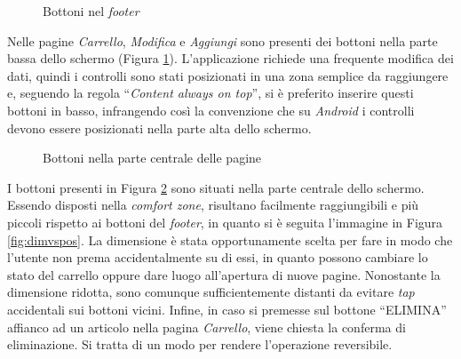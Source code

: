 \documentclass[12pt, a4paper, titlepage]{report}
\begin{document}
	\begin{figure}[H] 
		\centering
		\hspace*{2cm}
		\caption{Bottoni nel \textit{footer}}
		\label{fig:buttons}
	\end{figure}
	Nelle pagine \textit{Carrello}, \textit{Modifica} e \textit{Aggiungi} sono presenti dei bottoni nella parte bassa dello schermo (Figura \ref{fig:buttons}). L'applicazione richiede una frequente modifica dei dati, quindi i controlli sono stati posizionati in una zona semplice da raggiungere e, seguendo la regola ``\textit{Content always on top}'', si è preferito inserire questi bottoni in basso, infrangendo così la convenzione che su \textit{Android} i controlli devono essere posizionati nella parte alta dello schermo. 
	\begin{figure}[H] 
		\centering
		\hspace*{1cm}
		\hspace*{1cm}
		\caption{Bottoni nella parte centrale delle pagine}
		\label{fig:item-buttons}
	\end{figure}
	\noindent I bottoni presenti in Figura \ref{fig:item-buttons} sono situati nella parte centrale dello schermo. Essendo disposti nella \textit{comfort zone}, risultano facilmente raggiungibili e più piccoli rispetto ai bottoni del \textit{footer}, in quanto si è seguita l'immagine in Figura \ref{fig:dimvspos}. La dimensione è stata opportunamente scelta per fare in modo che l'utente non prema accidentalmente su di essi, in quanto possono cambiare lo stato del carrello oppure dare luogo all'apertura di nuove pagine. Nonostante la dimensione ridotta, sono comunque sufficientemente distanti da evitare \textit{tap} accidentali sui bottoni vicini. Infine, in caso si premesse sul bottone ``ELIMINA'' affianco ad un articolo nella pagina \textit{Carrello}, viene chiesta la conferma di eliminazione. Si tratta di un modo per rendere l'operazione reversibile.
\end{document}
